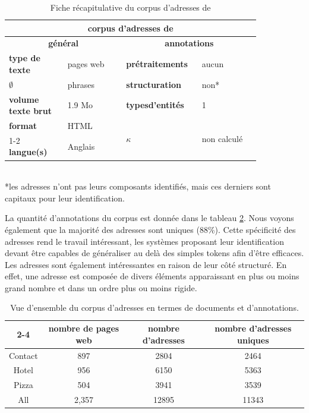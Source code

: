 \documentclass[12pt,a4paper,times,twoside,openright]{report}
\begin{document}
\begin{table}[ht!]
\centering
\begin{tabular}{|p{0.21\linewidth}|p{0.21\linewidth}|p{0.21\linewidth}|p{0.21\linewidth}|}
\hline
\multicolumn{4}{|c|}{\textbf{corpus d'adresses de \citet{yu2007high}}} \\
\hline
\multicolumn{2}{|c|}{\textbf{général}} & \multicolumn{2}{c|}{\textbf{annotations}} \\
\hline
\textbf{type de texte} & pages web & \textbf{prétraitements} & aucun \\
\hline
\textbf{$\emptyset$} & phrases & \textbf{structuration} & non* \\
\hline
\textbf{volume texte brut} & 1.9 Mo & \textbf{types\newline d'entités} & 1 \\
\hline
\textbf{format} & HTML & \multirow{2}{*}{\textbf{$\kappa$}} & \multirow{2}{*}{non calculé} \\
\cline{1-2}
\textbf{langue(s)} & Anglais &  & \\
\hline
\end{tabular}
\scriptsize{\\ *les adresses n'ont pas leurs composants identifiés, mais ces derniers sont capitaux pour leur identification.}
\caption{Fiche récapitulative du corpus d'adresses de \citet{yu2007high}}
\label{tab:adresses-recap-card}
\end{table}

La quantité d'annotations du corpus est donnée dans le tableau \ref{tab:address-overview}. Nous voyons également que la majorité des adresses sont uniques (88\%). Cette spécificité des adresses rend le travail intéressant, les systèmes proposant leur identification devant être capables de généraliser au delà des simples tokens afin d'être efficaces. Les adresses sont également intéressantes en raison de leur côté structuré. En effet, une adresse est composée de divers éléments apparaissant en plus ou moins grand nombre et dans un ordre plus ou moins rigide.

\begin{table}[ht!]
\begin{tabular}{|c|ccc|}
\cline{2-4}
\multicolumn{1}{c|}{}   & nombre de pages web   & nombre d'adresses & nombre d'adresses uniques \\
\hline
Contact                 & 897                   & 2804              & 2464 \\
Hotel                   & 956                   & 6150              & 5363 \\
Pizza                   & 504                   & 3941              & 3539 \\
\hline
All                     & 2,357                 & 12895             & 11343 \\
\hline
\end{tabular}
\caption{Vue d'ensemble du corpus d'adresses en termes de documents et d'annotations.}
\label{tab:address-overview}
\end{table}
\end{document}
